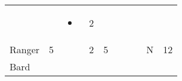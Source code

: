 \documentclass[12pt]{article}
\begin{document}
\begin{longtable}[]{@{}llllllllll@{}}
\begin{minipage}[t]{0.06\columnwidth}
\strut\end{minipage} &
\begin{minipage}[t]{0.06\columnwidth}\raggedright\strut
\strut\end{minipage} &
\begin{minipage}[t]{0.07\columnwidth}\raggedright\strut
\begin{itemize}
\item
\end{itemize}
\strut\end{minipage} &
\begin{minipage}[t]{0.08\columnwidth}\raggedright\strut
2
\strut\end{minipage}\tabularnewline
\begin{minipage}[t]{0.13\columnwidth}\raggedright\strut
Ranger
\strut\end{minipage} &
\begin{minipage}[t]{0.06\columnwidth}\raggedright\strut
5
\strut\end{minipage} &
\begin{minipage}[t]{0.06\columnwidth}\raggedright\strut
\strut\end{minipage} &
\begin{minipage}[t]{0.06\columnwidth}\raggedright\strut
2
\strut\end{minipage} &
\begin{minipage}[t]{0.06\columnwidth}\raggedright\strut
5
\strut\end{minipage} &
\begin{minipage}[t]{0.06\columnwidth}\raggedright\strut
\strut\end{minipage} &
\begin{minipage}[t]{0.06\columnwidth}\raggedright\strut
\strut\end{minipage} &
\begin{minipage}[t]{0.06\columnwidth}\raggedright\strut
\strut\end{minipage} &
\begin{minipage}[t]{0.07\columnwidth}\raggedright\strut
N
\strut\end{minipage} &
\begin{minipage}[t]{0.08\columnwidth}\raggedright\strut
12
\strut\end{minipage}\tabularnewline
\begin{minipage}[t]{0.13\columnwidth}\raggedright\strut
Bard
\strut\end{minipage} &
\begin{minipage}[t]{0.06\columnwidth}\raggedright\strut
\strut\end{minipage} &

\end{longtable}
\end{document}
